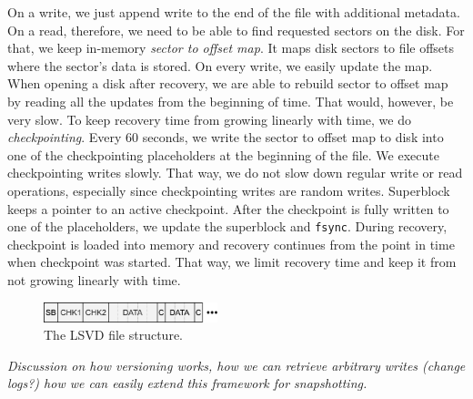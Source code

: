On a write, we just append write to the end of the file with additional metadata. On a read, therefore, we need to be able to find requested sectors on the disk. For that, we keep in-memory \emph{sector to offset map}. It maps disk sectors to file offsets where the sector's data is stored. On every write, we easily update the map. When opening a disk after recovery, we are able to rebuild sector to offset map by reading all the updates from the beginning of time. That would, however, be very slow. To keep recovery time from growing linearly with time, we do \emph{checkpointing}. Every 60 seconds, we write the sector to offset map to disk into one of the checkpointing placeholders at the beginning of the file. We execute checkpointing writes slowly. That way, we do not slow down regular write or read operations, especially since checkpointing writes are random writes. Superblock keeps a pointer to an active checkpoint. After the checkpoint is fully written to one of the placeholders, we update the superblock and \texttt{fsync}. During recovery, checkpoint is loaded into memory and recovery continues from the point in time when checkpoint was started. That way, we limit recovery time and keep it from not growing linearly with time.

\begin{figure}[h]
    \includegraphics[width=0.45\textwidth]{./figures/lsvd.pdf}
    \caption{The LSVD file structure.}
    \label{fig:lsvd}
\end{figure}

\emph{Discussion on how versioning works, how we can retrieve arbitrary 
writes (change logs?) how we can easily extend this framework for snapshotting.}
